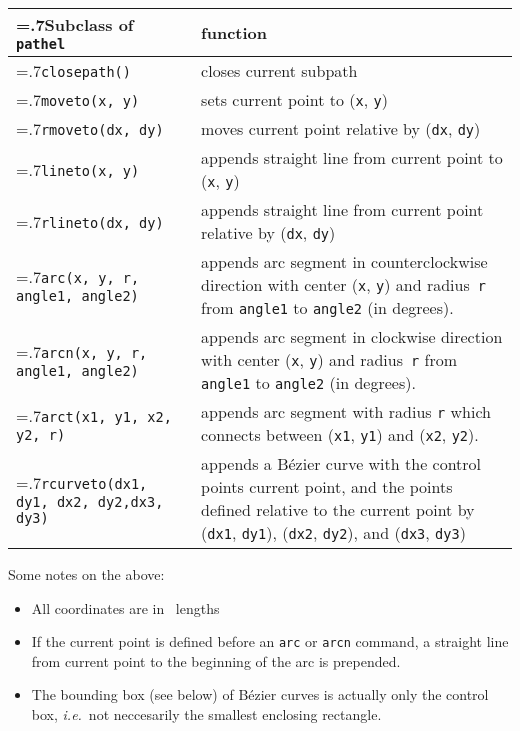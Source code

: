 \medskip
\begin{tabularx}{\linewidth}{>{\hsize=.7\hsize}X>{\raggedright\arraybackslash\hsize=1.3\hsize}X}
Subclass of \texttt{pathel} & function \\
\hline
\texttt{closepath()} & closes current subpath \\
\texttt{moveto(x, y)} & sets current point to (\texttt{x},
\texttt{y})\\
\texttt{rmoveto(dx, dy)} & moves current point relative by (\texttt{dx},
\texttt{dy})\\
\texttt{lineto(x, y)} & appends straight line from current point to
(\texttt{x}, \texttt{y})\\
\texttt{rlineto(dx, dy)} & appends straight line from current point
relative by (\texttt{dx}, \texttt{dy})\\
\texttt{arc(x, y, r, \newline\phantom{arc(}angle1, angle2)} & appends arc segment in
counterclockwise direction with center (\verb|x|, \verb|y|) and
radius~\verb|r| from \verb|angle1| to \verb|angle2| (in degrees).\\
\texttt{arcn(x, y, r, \newline\phantom{arcn(}angle1, angle2)} & appends arc segment in
clockwise direction with center (\verb|x|, \verb|y|) and
radius~\verb|r| from \verb|angle1| to \verb|angle2| (in degrees). \\
\texttt{arct(x1, y1, x2, y2, r)} & appends arc segment with radius \verb|r|
which connects between (\verb|x1|, \verb|y1|) and (\verb|x2|,
\verb|y2|).\\
\texttt{rcurveto(dx1, dy1, \newline\phantom{rcurveto(}dx2, dy2,\newline\phantom{rcurveto(}dx3, dy3)} & appends a B\'ezier curve with
the control points current point, and the points defined relative to
the current point by (\verb|dx1|, \verb|dy1|), 
(\verb|dx2|, \verb|dy2|), and (\verb|dx3|, \verb|dy3|)
\end{tabularx}
\medskip

Some notes on the above:
\begin{itemize}
\item All coordinates are in \PyX\ lengths
\item If the current point is defined before an \verb|arc| or
  \verb|arcn| command, a straight line from current point to the
  beginning of the arc is prepended.
\item The bounding box (see below) of B\'ezier curves is actually only
  the control box, \textit{i.e.}\ not neccesarily the smallest
  enclosing rectangle.
\end{itemize}


